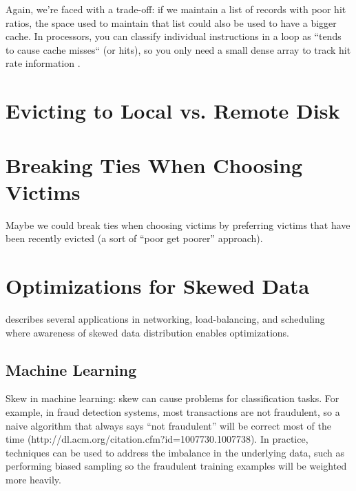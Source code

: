 \documentclass[12pt]{article}
\begin{document}
Again, we're faced with a trade-off: if we maintain a list of records with poor hit ratios, the space used to maintain that list could also be used to have a bigger cache.  In processors, you can classify individual instructions in a loop as ``tends to cause cache misses`` (or hits), so you only need a small dense array to track hit rate information \cite{automatic-cache-bypass}.





\section{Evicting to Local vs. Remote Disk}

\section{Breaking Ties When Choosing Victims}

Maybe we could break ties when choosing victims by preferring victims that have been recently evicted (a sort of ``poor get poorer'' approach).

\pagebreak
\section{Optimizations for Skewed Data}

\cite{perf-eval-heavy-tail} describes several applications in networking, load-balancing, and scheduling where awareness of skewed data distribution enables optimizations.

\subsection{Machine Learning}

Skew in machine learning: skew can cause problems for classification tasks.
For example, in fraud detection systems, most transactions are not
fraudulent, so a naive algorithm that always says ``not fraudulent'' will be
correct most of the time
(http://dl.acm.org/citation.cfm?id=1007730.1007738).  In practice,
techniques can be used to address the imbalance in the underlying data, such
as performing biased sampling so the fraudulent training examples will be
weighted more heavily.
\end{document}

